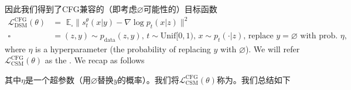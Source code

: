 因此我们得到了CFG兼容的（即考虑$\varnothing$可能性的）目标函数 
\begin{align}
    \label{eq:cfg_guided_dsm}
    \mathcal{L}_{\text{DSM}}^{\text{CFG}}(\theta) &= \,\,\mathbb{E}_{\square} \lVert s_t^{\theta}(x|y) - \nabla \log p_t(x|z)\rVert^2\\
    \square &= (z,y) \sim p_{\text{data}}(z,y),\, t \sim \text{Unif}[0,1),\, x \sim p_t(\cdot|z),\,\text{replace }y=\varnothing\text{ with prob. }\eta,
\end{align}
where $\eta$ is a hyperparameter (the probability of replacing $y$ with $\varnothing$). We will refer $\mathcal{L}_{\text{CSM}}^{\text{CFG}}(\theta)$ as the . We recap as follows

其中$\eta$是一个超参数（用$\varnothing$替换$y$的概率）。我们将$\mathcal{L}_{\text{CSM}}^{\text{CFG}}(\theta)$称为。我们总结如下

